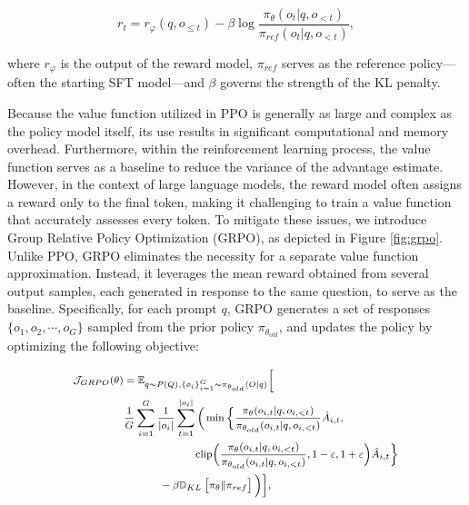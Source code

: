 \begin{equation}
    r_{t} = r_\varphi(q, o_{\le t}) - \beta \log\frac{\pi_{\theta}(o_{t}|q, o_{<t})}{\pi_{ref}(o_{t}|q, o_{<t})},
\label{eq:PPO-reward}
\end{equation}

where $r_\varphi$ is the output of the reward model, $\pi_{ref}$ serves as the reference policy—often the starting SFT model—and $\beta$ governs the strength of the KL penalty.

Because the value function utilized in PPO is generally as large and complex as the policy model itself, its use results in significant computational and memory overhead. Furthermore, within the reinforcement learning process, the value function serves as a baseline to reduce the variance of the advantage estimate. However, in the context of large language models, the reward model often assigns a reward only to the final token, making it challenging to train a value function that accurately assesses every token. To mitigate these issues, we introduce Group Relative Policy Optimization (GRPO), as depicted in Figure \ref{fig:grpo}. Unlike PPO, GRPO eliminates the necessity for a separate value function approximation. Instead, it leverages the mean reward obtained from several output samples, each generated in response to the same question, to serve as the baseline. Specifically, for each prompt $q$, GRPO generates a set of responses $\{o_1, o_2, \cdots, o_G\}$ sampled from the prior policy $\pi_{\theta_{old}}$, and updates the policy by optimizing the following objective:

\begin{equation}
\footnotesize
\begin{split}
    \mathcal{J}_{GRPO}(\theta) &= \mathbb{E}_{q \sim P(Q), \{o_i\}_{i=1}^G \sim \pi_{\theta_{old}}(O|q)} \bigg[ \\
    & \frac{1}{G}\sum_{i=1}^G \frac{1}{|o_i|} \sum_{t=1}^{|o_i|} \bigg( \min \Big\{ \frac{\pi_\theta(o_{i,t} | q, o_{i,<t})}{\pi_{\theta_{old}}(o_{i,t} | q, o_{i,<t})} \hat{A}_{i,t}, \\
    & \hspace{2cm} \text{clip}\Big( \frac{\pi_\theta(o_{i,t} | q, o_{i,<t})}{\pi_{\theta_{old}}(o_{i,t} | q, o_{i,<t})}, 1 - \varepsilon, 1 + \varepsilon \Big) \hat{A}_{i,t} \Big\} \\
    & \hspace{1cm} - \beta \mathbb{D}_{KL}\left[\pi_{\theta} \| \pi_{ref}\right] \bigg) \bigg],
\end{split}
\label{eq:GRPO-obj}
\end{equation}

